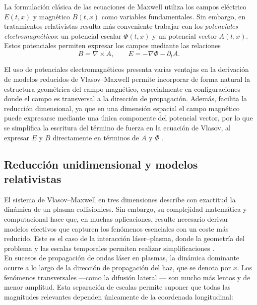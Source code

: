 \documentclass[11pt,a4paper,twoside,pdf]{article}
\numberwithin{equation}{section}
\begin{document}
La formulación clásica de las ecuaciones de Maxwell utiliza los campos eléctrico
$E(t,x)$ y magnético $B(t,x)$ como variables fundamentales. Sin embargo, en tratamientos relativistas resulta más conveniente trabajar con los \emph{potenciales
electromagnéticos}: un potencial escalar $\Phi(t,x)$ y un potencial vector $A(t,x)$.
Estos potenciales permiten expresar los campos mediante las relaciones \cite{martin2021campo}
\begin{equation}
B = \nabla \times A, \qquad
E = -\nabla \Phi - \partial_t A.
\label{eq:potenciales}
\end{equation}


El uso de potenciales electromagnéticos presenta varias ventajas en la derivación de
modelos reducidos de Vlasov–Maxwell permite incorporar de forma natural la estructura geométrica del campo
magnético, especialmente en configuraciones donde el campo es transversal a
la dirección de propagación. Además, facilita la reducción dimensional, ya que en una dimensión espacial el campo magnético puede expresarse mediante una única componente del potencial vector, por lo que se simplifica la escritura del término de fuerza en la ecuación de Vlasov, al expresar $E$ y $B$ directamente en términos de $A$ y $\Phi$ \cite{carrillo2006global}.








\subsection{Reducción unidimensional y modelos relativistas}

El sistema de Vlasov–Maxwell en tres dimensiones describe con exactitud la
dinámica de un plasma collisionless. Sin embargo, su complejidad matemática y
computacional hace que, en muchas aplicaciones, resulte necesario derivar modelos
efectivos que capturen los fenómenos esenciales con un coste más reducido. Este es
el caso de la interacción láser–plasma, donde la geometría del problema y las
escalas temporales permiten realizar simplificaciones \cite{ghizzo1990vlasov}.\\



En sucesos de propagación de ondas láser en plasmas, la dinámica
dominante ocurre a lo largo de la dirección de propagación del haz, que se denota por $x$. Los fenómenos transversales —como la difusión lateral — son mucho más lentos y de menor amplitud. Esta separación de
escalas permite suponer que todas las magnitudes relevantes dependen únicamente
de la coordenada longitudinal:
\end{document}
